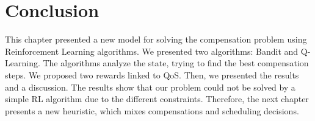 \section{Conclusion}
This chapter presented a new model for solving the compensation problem using Reinforcement Learning algorithms. We presented two algorithms: Bandit and Q-Learning. The algorithms analyze the state, trying to find the best compensation steps. We proposed two rewards linked to QoS. Then, we presented the results and a discussion. The results show that our problem could not be solved by a simple RL algorithm due to the different constraints. Therefore, the next chapter presents a new heuristic, which mixes compensations and scheduling decisions.